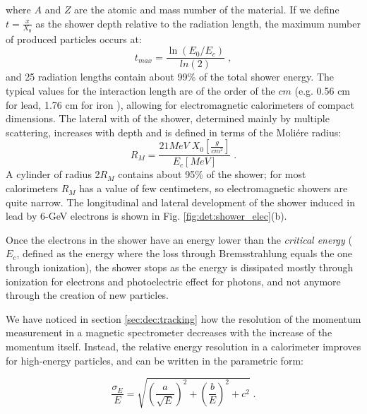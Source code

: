 where $A$ and $Z$ are the atomic and mass number of the material. If we define $t = \frac{x}{X_0}$ as the shower depth relative to the radiation length, the maximum number of produced particles occurs at:
\begin{equation}
t_{max} = \frac{\ln \left(E_0/E_c\right)}{ln\left(2\right)} \;,
\end{equation}
and 25 radiation lengths contain about 99\% of the total shower energy. The typical values for the interaction length are of the order of the $cm$ (e.g. 0.56 cm for lead, 1.76 cm for iron \cite{Patrignani:2016xqp}), allowing for electromagnetic calorimeters of compact dimensions. 
The lateral with of the shower, determined mainly by multiple scattering, increases with depth and is defined in terms of the Moli\'ere radius:
\begin{equation}
R_M = \frac{21 MeV \; X_0[\frac{g}{cm^2}]}{E_c [MeV]} \; .
\end{equation}
A cylinder of radius 2$R_M$ contains about 95\% of the shower; for most calorimeters $R_M$ has a value of few centimeters, so electromagnetic showers are quite narrow. The longitudinal and lateral development of the shower induced in lead by 6-GeV electrons is shown in Fig. \ref{fig:det:shower_elec}(b).

Once the electrons in the shower have an energy lower than the \textit{critical energy} ($E_c$, defined as the energy where the loss through Bremsstrahlung equals the one through ionization), the shower stops as the energy is dissipated mostly through ionization for electrons and photoelectric effect for photons, and not anymore through the creation of new particles.


We have noticed in section \ref{sec:dec:tracking} how the resolution of the momentum measurement in a magnetic spectrometer decreases with the increase of the momentum itself. Instead, the relative energy resolution in a calorimeter improves for high-energy particles, and can be written in the parametric form:

\begin{equation}
\frac{\sigma_E}{E} = \sqrt{\left(\frac{a}{\sqrt{E}} \right)^2 + \left( \frac{b}{E} \right)^2 + c^2 } \; .
\end{equation}

